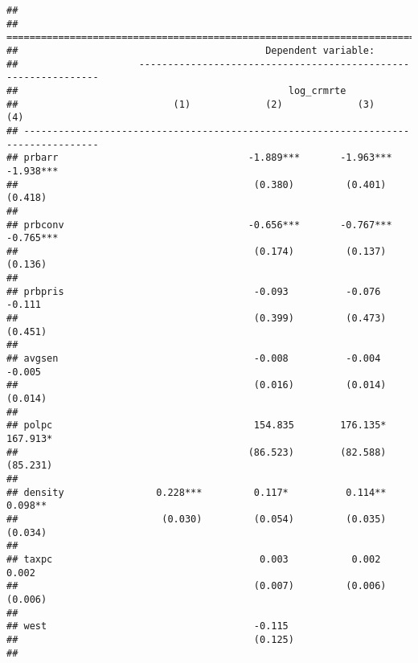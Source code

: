\documentclass[
]{article}
\begin{document}
\begin{verbatim}
## 
## ===================================================================================
##                                           Dependent variable:                      
##                     ---------------------------------------------------------------
##                                               log_crmrte                           
##                           (1)             (2)             (3)             (4)      
## -----------------------------------------------------------------------------------
## prbarr                                 -1.889***       -1.963***       -1.938***   
##                                         (0.380)         (0.401)         (0.418)    
##                                                                                    
## prbconv                                -0.656***       -0.767***       -0.765***   
##                                         (0.174)         (0.137)         (0.136)    
##                                                                                    
## prbpris                                 -0.093          -0.076          -0.111     
##                                         (0.399)         (0.473)         (0.451)    
##                                                                                    
## avgsen                                  -0.008          -0.004          -0.005     
##                                         (0.016)         (0.014)         (0.014)    
##                                                                                    
## polpc                                   154.835        176.135*        167.913*    
##                                        (86.523)        (82.588)        (85.231)    
##                                                                                    
## density                0.228***         0.117*          0.114**         0.098**    
##                         (0.030)         (0.054)         (0.035)         (0.034)    
##                                                                                    
## taxpc                                    0.003           0.002           0.002     
##                                         (0.007)         (0.006)         (0.006)    
##                                                                                    
## west                                    -0.115                                     
##                                         (0.125)                                    
##                                                                                    

\end{verbatim}
\end{document}
